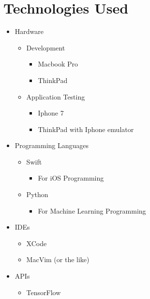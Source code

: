 \chapter{Technologies Used}

\begin{itemize}
	\item Hardware
	\begin{itemize}
		\item Development
		\begin{itemize}
			\item Macbook Pro
			\item ThinkPad
		\end{itemize}
		\item Application Testing
			\begin{itemize}
				\item Iphone 7
				\item ThinkPad with Iphone emulator
			\end{itemize}
	\end{itemize}
	\item Programming Languages
	\begin{itemize}
		\item Swift
		\begin{itemize}
			\item For iOS Programming
		\end{itemize}
		\item Python
		\begin{itemize}
			\item For Machine Learning Programming
		\end{itemize}
	\end{itemize}
	\item IDEs
	\begin{itemize}
		\item XCode
		\item MacVim (or the like)
	\end{itemize}
	\item APIs
	\begin{itemize}
		\item TensorFlow
	\end{itemize}
\end{itemize}